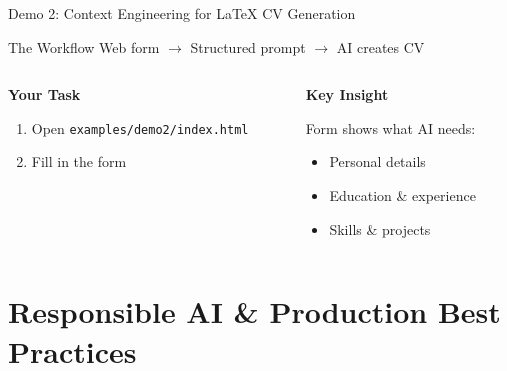 \documentclass[aspectratio=169]{beamer}
\begin{document}
\begin{frame}{Demo 2: Context Engineering for LaTeX CV Generation}
  \begin{block}{The Workflow}
    Web form $\rightarrow$ Structured prompt $\rightarrow$ AI creates CV
  \end{block}

  \vspace{0.3cm}

  \begin{columns}[T]
    \begin{column}{0.48\textwidth}
      \centering
      \large\bfseries
      \textcolor{conesaTeal}{Your Task}

      \vspace{0.3cm}
      \normalsize

      \begin{enumerate}
        \item Open \texttt{examples/demo2/index.html}
        \item Fill in the form
      \end{enumerate}
    \end{column}
    \begin{column}{0.48\textwidth}
      \centering
      \large\bfseries
      \textcolor{conesaOrange}{Key Insight}

      \vspace{0.3cm}
      \normalsize

      Form shows what AI needs:

      \vspace{0.2cm}
      \begin{itemize}
        \item Personal details
        \item Education \& experience
        \item Skills \& projects
      \end{itemize}
    \end{column}
  \end{columns}
\end{frame}

\section{Responsible AI \& Production Best Practices}
\end{document}

